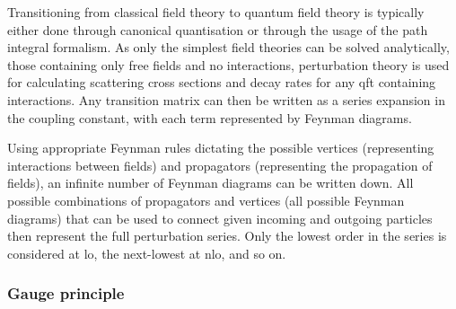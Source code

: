 Transitioning from classical field theory to quantum field theory is typically either done through canonical quantisation or through the usage of the path integral formalism. As only the simplest field theories can be solved analytically, \ie those containing only free fields and no interactions, perturbation theory is used for calculating scattering cross sections and decay rates for any \gls{qft} containing interactions. Any transition matrix can then be written as a series expansion in the coupling constant, with each term represented by Feynman diagrams. 

Using appropriate Feynman rules dictating the possible vertices (representing interactions between fields) and propagators (representing the propagation of fields), an infinite number of Feynman diagrams can be written down. All possible combinations of propagators and vertices (\ie all possible Feynman diagrams) that can be used to connect given incoming and outgoing particles then represent the full perturbation series. Only the lowest order in the series is considered at \gls{lo}, the next-lowest at \gls{nlo}, and so on.


\subsubsection{Gauge principle}
\label{sec:gauge_principle}

